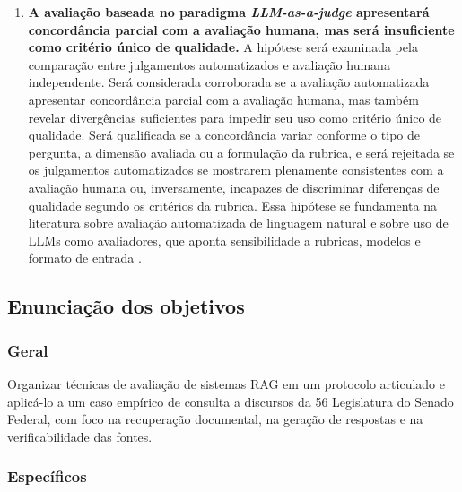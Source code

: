 \begin{enumerate}[label=\textbf{H\arabic*. }, leftmargin=*, widest=H3, align=left]
  \item \textbf{A avaliação baseada no paradigma \textit{LLM-as-a-judge} apresentará concordância parcial com a avaliação humana, mas será insuficiente como critério único de qualidade.} A hipótese será examinada pela comparação entre julgamentos automatizados e avaliação humana independente. Será considerada corroborada se a avaliação automatizada apresentar concordância parcial com a avaliação humana, mas também revelar divergências suficientes para impedir seu uso como critério único de qualidade. Será qualificada se a concordância variar conforme o tipo de pergunta, a dimensão avaliada ou a formulação da rubrica, e será rejeitada se os julgamentos automatizados se mostrarem plenamente consistentes com a avaliação humana ou, inversamente, incapazes de discriminar diferenças de qualidade segundo os critérios da rubrica. Essa hipótese se fundamenta na literatura sobre avaliação automatizada de linguagem natural e sobre uso de LLMs como avaliadores, que aponta sensibilidade a rubricas, modelos e formato de entrada \parencite{liuEtAl2023geval,liuEtAl2025judgeRag}.
\end{enumerate}

\subsection{Enunciação dos objetivos}

\subsubsection{Geral}

Organizar técnicas de avaliação de sistemas RAG em um protocolo articulado e aplicá-lo a um caso empírico de consulta a discursos da 56\textordfeminine{} Legislatura do Senado Federal, com foco na recuperação documental, na geração de respostas e na verificabilidade das fontes.

\subsubsection{Específicos}

